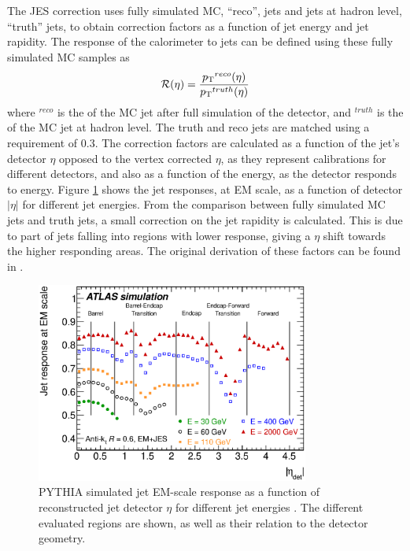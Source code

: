 The JES correction uses fully simulated MC, ``reco'', jets and jets at hadron level, ``truth'' jets, to obtain correction factors as a function of jet energy and jet rapidity. 
The response of the calorimeter to jets can be defined using these fully simulated MC samples as
\begin{equation}
\mathcal{R(\eta)} = \frac{\mbox{$p_{\rm T}$}{}^{reco}(\eta)}{\mbox{$p_{\rm T}$}{}^{truth}(\eta)}
\label{JetPerf:MCJetResp}
\end{equation}
where \pt{}$^{reco}$ is the \pt{} of the MC jet after full simulation of the detector, and  \pt{}$^{truth}$ is the \pt{} of the MC jet at hadron level.
The truth and reco jets are matched using a \dr{} requirement of 0.3.
The correction factors are calculated as a function of the jet's detector $\eta$ opposed to the vertex corrected $\eta$, as they represent calibrations for different detectors, and also as a function of the energy, as the detector responds to energy. 
Figure \ref{Det:MCResp} shows the jet responses, at EM scale, as a function of detector $|\eta|$ for different jet energies. 
From the comparison between fully simulated MC jets and truth jets, a small correction on the jet rapidity is calculated. 
This is due to part of jets falling into regions with lower response, giving a $\eta$ shift towards the higher responding areas. 
The original derivation of these factors can be found in \cite{ref:OffsetCorrection,ref:JES,ref:JES_basic}.

\begin{figure}
\centering
\includegraphics[width=0.8\textwidth]{figures/Detector/JetCalibfig_JES_vs_eta_Binning.eps}

\caption[Jet response for different regions of the ATLAS calorimeter]{ 
PYTHIA simulated jet EM-scale response as a function of reconstructed jet detector $\eta$ for different jet energies \cite{ref:JES}.
The different evaluated regions are shown, as well as their relation to the detector geometry. 
\label{Det:MCResp}
}
\end{figure}


